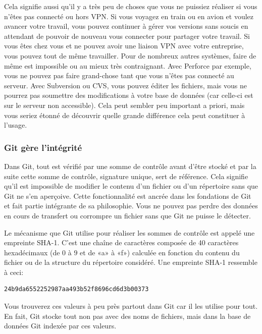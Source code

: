 Cela signifie aussi qu'il y a très peu de choses que vous ne puissiez réaliser si vous n'êtes pas connecté ou hors VPN.
Si vous voyagez en train ou en avion et voulez avancer votre travail, vous pouvez continuer à gérer vos versions sans soucis en attendant de pouvoir de nouveau vous connecter pour partager votre travail.
Si vous êtes chez vous et ne pouvez avoir une liaison VPN avec votre entreprise, vous pouvez tout de même travailler.
Pour de nombreux autres systèmes, faire de même est impossible ou au mieux très contraignant.
Avec Perforce par exemple, vous ne pouvez pas faire grand-chose tant que vous n'êtes pas connecté au serveur.
Avec Subversion ou CVS, vous pouvez éditer les fichiers, mais vous ne pourrez pas soumettre des modifications à votre base de données (car celle-ci est sur le serveur non accessible).
Cela peut sembler peu important a priori, mais vous seriez étonné de découvrir quelle grande différence cela peut constituer à l'usage.

\subsubsection{Git gère l'intégrité}

Dans Git, tout est vérifié par une somme de contrôle avant d'être stocké et par la suite cette somme de contrôle, signature unique, sert de référence.
Cela signifie qu'il est impossible de modifier le contenu d'un fichier ou d'un répertoire sans que Git ne s'en aperçoive.
Cette fonctionnalité est ancrée dans les fondations de Git et fait partie intégrante de sa philosophie.
Vous ne pouvez pas perdre des données en cours de transfert ou corrompre un fichier sans que Git ne puisse le détecter.

Le mécanisme que Git utilise pour réaliser les sommes de contrôle est appelé une empreinte SHA-1.
C'est une chaîne de caractères composée de 40 caractères hexadécimaux (de $0$ à $9$ et de «a» à «f») calculée en fonction du contenu du fichier ou de la structure du répertoire considéré.
Une empreinte SHA-1 ressemble à ceci:
\begin{Schunk}
\begin{Verbatim}
24b9da6552252987aa493b52f8696cd6d3b00373
\end{Verbatim}
\end{Schunk}

Vous trouverez ces valeurs à peu près partout dans Git car il les utilise pour tout.
En fait, Git stocke tout non pas avec des noms de fichiers, mais dans la base de données Git indexée par ces valeurs.

